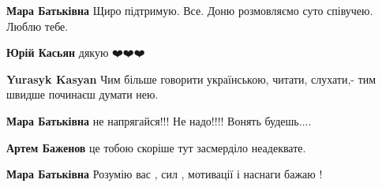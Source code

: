 \begin{itemize}
\begin{itemize}
\textbf{Мара Батьківна} Щиро підтримую. Все. Доню розмовляємо суто співучею. Люблю тебе.

\begin{itemize}
 
\textbf{Юрій Касьян} дякую ❤️❤️❤️

 
\textbf{Yurasyk Kasyan} Чим більше говорити українською, читати, слухати,- тим швидше починаєш думати нею.
\end{itemize}

 
\textbf{Мара Батьківна} не напрягайся!!! Не надо!!!! Вонять будешь....

\begin{itemize}
 
\textbf{Артем Баженов} це тобою скоріше тут засмерділо неадеквате.
\end{itemize}

 
\textbf{Мара Батьківна} Розумію вас , сил , мотивації і наснаги бажаю !

 

\end{itemize}
\end{itemize}
